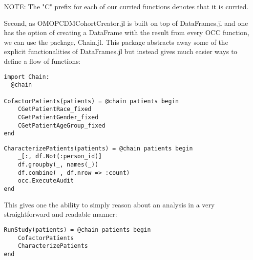 \documentclass{juliacon}
\begin{document}
NOTE: The "C" prefix for each of our curried functions denotes that it is curried.

Second, as OMOPCDMCohortCreator.jl is built on top of DataFrames.jl and one has the option of creating a DataFrame with the result from every OCC function, we can use the package, Chain.jl.
This package abstracts away some of the explicit functionalities of DataFrames.jl but instead gives much easier ways to define a flow of functions:

\begin{listing}[!ht]
\begin{verbatim}
import Chain:
  @chain

CofactorPatients(patients) = @chain patients begin
    CGetPatientRace_fixed
    CGetPatientGender_fixed
    CGetPatientAgeGroup_fixed
end
\end{verbatim}
\caption{}
\label{listing:}
\end{listing}

\begin{listing}[!ht]
\begin{verbatim}
CharacterizePatients(patients) = @chain patients begin
    _[:, df.Not(:person_id)]
    df.groupby(_, names(_))
    df.combine(_, df.nrow => :count)
    occ.ExecuteAudit
end
\end{verbatim}
\caption{}
\label{listing:}
\end{listing}

This gives one the ability to simply reason about an analysis in a very straightforward and readable manner:

\begin{listing}[!ht]
\begin{verbatim}
RunStudy(patients) = @chain patients begin
    CofactorPatients
    CharacterizePatients
end
\end{verbatim}
\caption{}
\label{listing:}
\end{listing}
\end{document}
